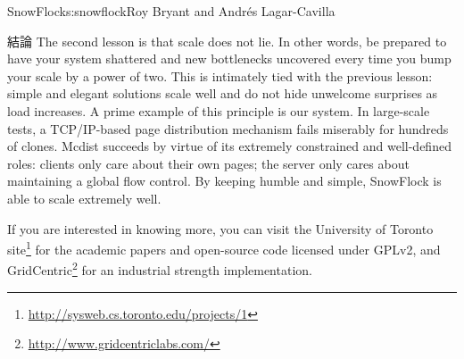\begin{aosachapter}{SnowFlock}{s:snowflock}{Roy Bryant and Andr\'e{s} Lagar-Cavilla}
\begin{aosasect1}{結論}
The second lesson is that scale does not lie. In other words, be
prepared to have your system shattered and new bottlenecks uncovered
every time you bump your scale by a power of two. This is intimately
tied with the previous lesson: simple and elegant solutions scale well
and do not hide unwelcome surprises as load increases. A prime example
of this principle is our  system. In large-scale tests, a
TCP/IP-based page distribution mechanism fails miserably for hundreds
of clones. Mcdist succeeds by virtue of its extremely constrained and
well-defined roles: clients only care about their own pages; the
server only cares about maintaining a global flow control. By keeping
 humble and simple, SnowFlock is able to scale extremely well.

If you are interested in knowing more, you can visit the University of
Toronto site\footnote{\url{http://sysweb.cs.toronto.edu/projects/1}} for the
academic papers and open-source code licensed under GPLv2, and
GridCentric\footnote{\url{http://www.gridcentriclabs.com/}} for an industrial strength
implementation.

\end{aosasect1}

\end{aosachapter}


